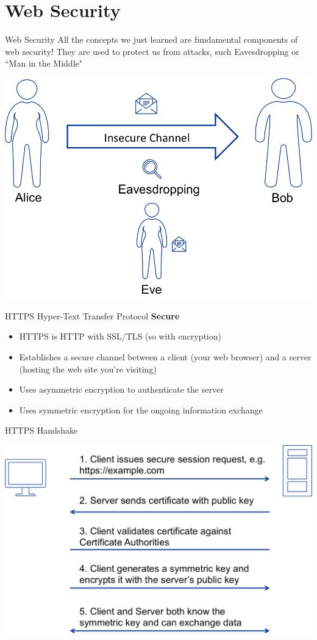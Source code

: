 \documentclass{beamer}
\begin{document}
\section{Web Security}
\frame{\sectionpage}

\begin{frame}{Web Security}
All the concepts we just learned are fundamental components of web security! They are used to protect us from attacks, such Eavesdropping or ``Man in the Middle"
\begin{center}
	\includegraphics[width=0.5\linewidth]{insecure-channel.png}
\end{center}
\end{frame}

\begin{frame}{{\color{red}HTTPS}}
Hyper-Text Transfer Protocol \textbf{Secure} 
\begin{itemize}
\item HTTPS is HTTP with SSL/TLS (so with encryption)
\item Establishes a secure channel between a client (your web browser) and a server (hosting the web site you're visiting) 
\item Uses asymmetric encryption to authenticate the server 
\item Uses symmetric encryption for the ongoing information exchange
\end{itemize}
\end{frame}

\begin{frame}{{\color{red}HTTPS Handshake}}
\begin{center}
\includegraphics[width=0.8\linewidth]{https-flow.png} 
\end{center}
\end{frame}
\end{document}
